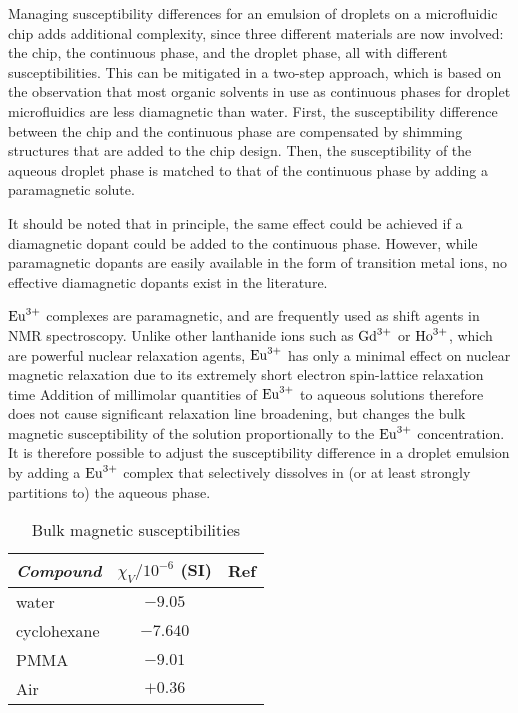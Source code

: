 Managing susceptibility differences for an emulsion of droplets on a
microfluidic chip adds additional complexity, since three different materials
are now involved: the chip, the continuous phase, and the droplet phase,
all with different susceptibilities.
This can be mitigated in a two-step approach,
which is based on the observation that most organic solvents in use
as continuous phases for droplet microfluidics are less diamagnetic than
water.
First, the susceptibility difference between the chip and the continuous phase
are compensated by shimming structures that are added to the
chip design. Then, the susceptibility of the aqueous droplet phase is matched
to that of the continuous phase by adding a paramagnetic solute.

It should be noted that in principle, the same effect could be achieved if
a diamagnetic dopant could be added to the continuous phase. However, while paramagnetic
dopants are easily available in the form of transition metal ions, no
effective diamagnetic dopants exist in the literature.

$\ce{Eu^{3+}}$ complexes are paramagnetic, and are frequently used as
shift agents in NMR spectroscopy. Unlike other lanthanide ions such
as $\ce{Gd^{3+}}$ or $\ce{Ho^{3+}}$, which are powerful nuclear relaxation
agents, $\ce{Eu^{3+}}$ has only a minimal
effect on nuclear magnetic relaxation due to its extremely
short electron spin-lattice relaxation time\citep{Peters:1996bj} Addition of
millimolar quantities of $\ce{Eu^{3+}}$ to aqueous solutions
therefore does not cause significant relaxation line broadening, but changes
the bulk magnetic susceptibility of the solution proportionally
to the $\ce{Eu^{3+}}$ concentration. It is therefore possible
to adjust the susceptibility difference in a droplet emulsion
by adding a $\ce{Eu^{3+}}$ complex that selectively dissolves in (or at least
strongly partitions to) the aqueous phase.


\begin{table}
\begin{center}
    \caption{Bulk magnetic susceptibilities}
    \label{tab:suscept}
    \begin{tabular}{lcc}\hline\hline
      \emph{Compound} & $\chi_V/10^{-6}$ (SI) & Ref \\ \hline
      water           & $-9.05$               &    \citep{Rumble:2017tp}  \\
      cyclohexane     & $-7.640$              &    \citep{Rumble:2017tp} \\
      PMMA            & $-9.01$               &    \citep{Wapler:2014es}\\
      Air             & $+0.36$               &    \citep{Bakker:2006eea} \\ \hline\hline
    \end{tabular}
\end{center}
\end{table}



